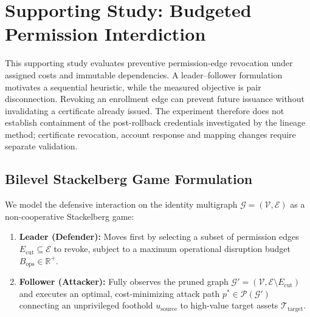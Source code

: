 \section{Supporting Study: Budgeted Permission Interdiction}
\label{sec:game_theoretic}

\setcounter{theorem}{0}
\renewcommand{\thetheorem}{B.\arabic{theorem}}
\providecommand{\theHtheorem}{}
\renewcommand{\theHtheorem}{appendixB.\arabic{theorem}}

This supporting study evaluates preventive permission-edge revocation under assigned costs and immutable dependencies. A leader--follower formulation motivates a sequential heuristic, while the measured objective is pair disconnection. Revoking an enrollment edge can prevent future issuance without invalidating a certificate already issued. The experiment therefore does not establish containment of the post-rollback credentials investigated by the lineage method; certificate revocation, account response and mapping changes require separate validation.

\subsection{Bilevel Stackelberg Game Formulation}
We model the defensive interaction on the identity multigraph $\mathcal{G} = (\mathcal{V}, \mathcal{E})$ as a non-cooperative Stackelberg game:
\begin{enumerate}
    \item \textbf{Leader (Defender):} Moves first by selecting a subset of permission edges $E_{\text{cut}} \subseteq \mathcal{E}$ to revoke, subject to a maximum operational disruption budget $B_{\text{ops}} \in \mathbb{R}^+$.
    \item \textbf{Follower (Attacker):} Fully observes the pruned graph $\mathcal{G}' = (\mathcal{V}, \mathcal{E} \setminus E_{\text{cut}})$ and executes an optimal, cost-minimizing attack path $p^* \in \mathcal{P}(\mathcal{G}')$ connecting an unprivileged foothold $u_{\text{source}}$ to high-value target assets $\mathcal{T}_{\text{target}}$.
\end{enumerate}

